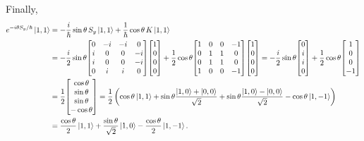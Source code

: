 \begin{solution}
	Finally,
	\begin{align*}
		\eitsyh \kqq &= -\frac{i}{\hbar} \sint \, \Sy \kqq + \frac{1}{\hbar} \cost \, K \kqq \\
		&= -\frac{i}{2} \sint \mqty[ 0 & -i & -i & 0 \\ i & 0 & 0 & -i \\ i & 0 & 0 & -i \\ 0 & i & i & 0 ] \mqty[ 1 \\ 0 \\ 0 \\ 0 ] + \frac{1}{2} \cost \mqty[ 1 & 0 & 0 & -1 \\ 0 & 1 & 1 & 0 \\ 0 & 1 & 1 & 0 \\ 1 & 0 & 0 & -1 ] \mqty[ 1 \\ 0 \\ 0 \\ 0 ]
		= -\frac{i}{2} \sint \mqty[ 0 \\ i \\ i \\ 0 ] + \frac{1}{2} \cost \mqty[ 1 \\ 0 \\ 0 \\ -1 ] \\
		&= \frac{1}{2} \mqty[ \cost \\ \sint \\ \sint \\ -\cost ]
		= \frac{1}{2} \left( \cost \kqq + \sint \frac{\kqo + \koo}{\sqrt{2}} + \sint \frac{\kqo - \koo}{\sqrt{2}} - \cost \kqnq \right) \\
		&= \frac{\cost}{2} \kqq + \frac{\sint}{\sqrt{2}} \kqo - \frac{\cost}{2} \kqnq.
	\end{align*}
\vfix
\end{solution}